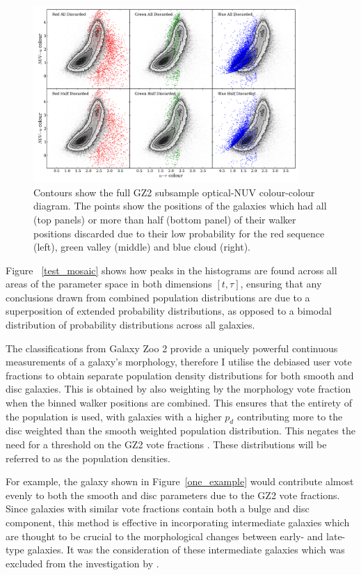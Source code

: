 \begin{figure}
\includegraphics[width=0.9\textwidth]{starpy/discarded_galaxy_colour_colour.pdf}
\caption[Colours of discarded galaxies]{Contours show the full GZ2 subsample optical-NUV colour-colour diagram. The points show the positions of the galaxies which had all (top panels) or more than half (bottom panel) of their walker positions discarded due to their low probability for the red sequence (left), green valley (middle) and blue cloud (right).}
\label{discarded}
\end{figure}

Figure ~\ref{test_mosaic} shows how peaks in the histograms are found across all areas of the parameter space in both dimensions $[t, \tau]$, ensuring that any conclusions drawn from combined population distributions are due to a superposition of extended probability distributions, as opposed to a bimodal distribution of probability distributions across all galaxies.

The classifications from Galaxy Zoo 2 provide a uniquely powerful continuous measurements of a galaxy's morphology, therefore I utilise the debiased user vote fractions to obtain separate population density distributions for both smooth and disc galaxies. This is obtained by also weighting by the morphology vote fraction when the binned walker positions are combined. This ensures that the entirety of the population is used, with galaxies with a higher $p_d$ contributing more to the disc weighted than the smooth weighted population distribution. This negates the need for a threshold on the GZ2 vote fractions \citep[e.g., $p_d > 0.8$ as used in][]{schawinski14}. These distributions will be referred to as the population densities.

For example, the galaxy shown in Figure~\ref{one_example} would contribute almost evenly to both the smooth and disc parameters due to the GZ2 vote fractions. Since galaxies with similar vote fractions contain both a bulge and disc component, this method is effective in incorporating intermediate galaxies which are thought to be crucial to the morphological changes between early- and late-type galaxies. It was the consideration of these intermediate galaxies which was excluded from the investigation by \citet{schawinski14}.

